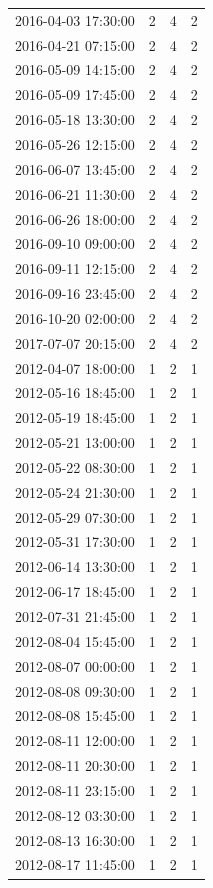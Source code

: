 \begin{tabular}{lrrr}
2016-04-03 17:30:00 & 2 & 4 & 2 \\
2016-04-21 07:15:00 & 2 & 4 & 2 \\
2016-05-09 14:15:00 & 2 & 4 & 2 \\
2016-05-09 17:45:00 & 2 & 4 & 2 \\
2016-05-18 13:30:00 & 2 & 4 & 2 \\
2016-05-26 12:15:00 & 2 & 4 & 2 \\
2016-06-07 13:45:00 & 2 & 4 & 2 \\
2016-06-21 11:30:00 & 2 & 4 & 2 \\
2016-06-26 18:00:00 & 2 & 4 & 2 \\
2016-09-10 09:00:00 & 2 & 4 & 2 \\
2016-09-11 12:15:00 & 2 & 4 & 2 \\
2016-09-16 23:45:00 & 2 & 4 & 2 \\
2016-10-20 02:00:00 & 2 & 4 & 2 \\
2017-07-07 20:15:00 & 2 & 4 & 2 \\
2012-04-07 18:00:00 & 1 & 2 & 1 \\
2012-05-16 18:45:00 & 1 & 2 & 1 \\
2012-05-19 18:45:00 & 1 & 2 & 1 \\
2012-05-21 13:00:00 & 1 & 2 & 1 \\
2012-05-22 08:30:00 & 1 & 2 & 1 \\
2012-05-24 21:30:00 & 1 & 2 & 1 \\
2012-05-29 07:30:00 & 1 & 2 & 1 \\
2012-05-31 17:30:00 & 1 & 2 & 1 \\
2012-06-14 13:30:00 & 1 & 2 & 1 \\
2012-06-17 18:45:00 & 1 & 2 & 1 \\
2012-07-31 21:45:00 & 1 & 2 & 1 \\
2012-08-04 15:45:00 & 1 & 2 & 1 \\
2012-08-07 00:00:00 & 1 & 2 & 1 \\
2012-08-08 09:30:00 & 1 & 2 & 1 \\
2012-08-08 15:45:00 & 1 & 2 & 1 \\
2012-08-11 12:00:00 & 1 & 2 & 1 \\
2012-08-11 20:30:00 & 1 & 2 & 1 \\
2012-08-11 23:15:00 & 1 & 2 & 1 \\
2012-08-12 03:30:00 & 1 & 2 & 1 \\
2012-08-13 16:30:00 & 1 & 2 & 1 \\
2012-08-17 11:45:00 & 1 & 2 & 1 \\

\end{tabular}

